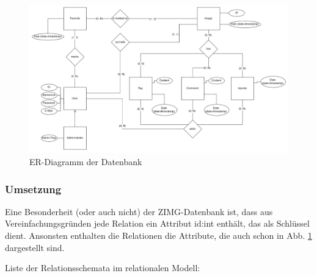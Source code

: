 \documentclass[12pt, oneside, a4paper]{article}		%
\begin{document}
\begin{figure}[H]
	\centering
	\includegraphics[width=\linewidth]{footage/ZIMG_ERDiagram_Database} 
	\caption{ER-Diagramm der Datenbank}
	\label{ERDiagramDatabase}
\end{figure}

\subsubsection{Umsetzung}

Eine Besonderheit (oder auch nicht) der ZIMG-Datenbank ist, dass aus Vereinfachungsgründen jede Relation ein Attribut id:int enthält, das als Schlüssel dient. Ansonsten enthalten die Relationen die Attribute, die auch schon in Abb. \ref{ERDiagramDatabase} dargestellt sind.

Liste der Relationsschemata im relationalen Modell:
\end{document}

